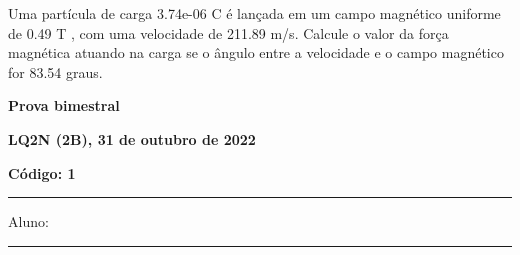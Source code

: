 \documentclass[12pt, addpoints]{exam}
\begin{document}
\begin{questions}
\begin{multicols*}{2}
\begin{oneparchoices}
\end{oneparchoices}
\question[20] Uma partícula de carga 3.74e-06 C é lançada em um campo magnético uniforme de    0.49 T , com uma velocidade de 211.89 m/s. Calcule o valor da força magnética atuando na carga se o ângulo entre a velocidade e o campo magnético for   83.54 graus.

\begin{oneparchoices}
\end{oneparchoices}
\end{multicols*}
\end{questions}
\newpage
        \begin{minipage}[b]{0.75\linewidth}
            \begin{flushleft}
                {\bf \large Prova bimestral}
            \end{flushleft}
            \begin{flushleft}
                {\bf \large LQ2N (2B), 31 de outubro de 2022}
            \end{flushleft}
        \end{minipage}
        \begin{minipage}[b]{0.20\linewidth}
            \begin{flushright}
                {\bf \large Código: 1}
            \end{flushright}
        \end{minipage}
        \vspace{0.5cm} \hrule \vspace{0.5cm}
        \begin{minipage}{0.75\linewidth}
            Aluno:
        \end{minipage}
        \vspace{0.5cm} \hrule \vspace{0.5cm}
\end{document}
